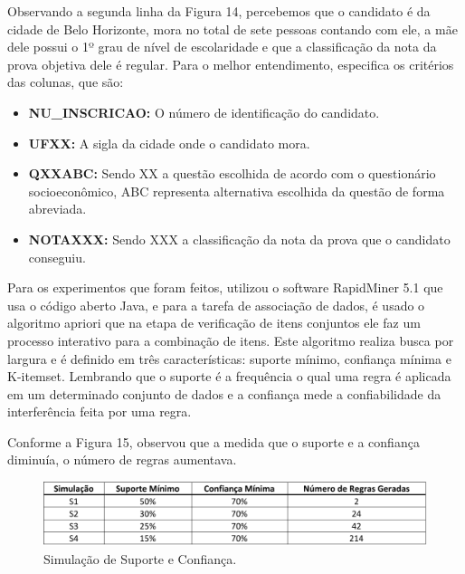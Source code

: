 \par
Observando a segunda linha da Figura 14, percebemos que o candidato é da cidade de Belo Horizonte, mora no total de sete pessoas contando com ele, a mãe dele possui o 1º grau de nível de escolaridade e que a classificação da nota da prova objetiva dele é regular. Para o melhor entendimento,  especifica os critérios das colunas, que são:

\begin{itemize}
    \item \textbf{NU\_INSCRICAO:} O número de identificação do candidato. 
    \item \textbf{UFXX:} A sigla da cidade onde o candidato mora.
    \item \textbf{QXXABC:} Sendo XX a questão escolhida de acordo com o questionário socioeconômico, ABC representa alternativa escolhida da questão de forma abreviada.
    \item \textbf{NOTAXXX:} Sendo XXX a classificação da nota da prova que o candidato conseguiu. 
\end{itemize}

\par
Para os experimentos que foram feitos,  utilizou o software RapidMiner 5.1 que usa o código aberto Java, e para a tarefa de associação de dados, é usado o algoritmo apriori que na etapa de verificação de itens conjuntos ele faz um processo interativo para a combinação de itens. Este algoritmo realiza busca por largura e é definido em três características: suporte mínimo, confiança mínima e K-itemset. Lembrando que o suporte é a frequência o qual uma regra é aplicada em um determinado conjunto de dados e a confiança mede a confiabilidade da interferência feita por uma regra. 

\par
Conforme a Figura 15,  observou que a medida que o suporte e a confiança diminuía, o número de regras aumentava.   

\begin{figure}[!htp]
	\begin{center}
    \caption{\label{fig:waveform_fig} Simulação de Suporte e Confiança.}
	\includegraphics[scale=0.49]{Figuras/Simulacao_suporte_confianca.png}
	\end{center}
\end{figure}

